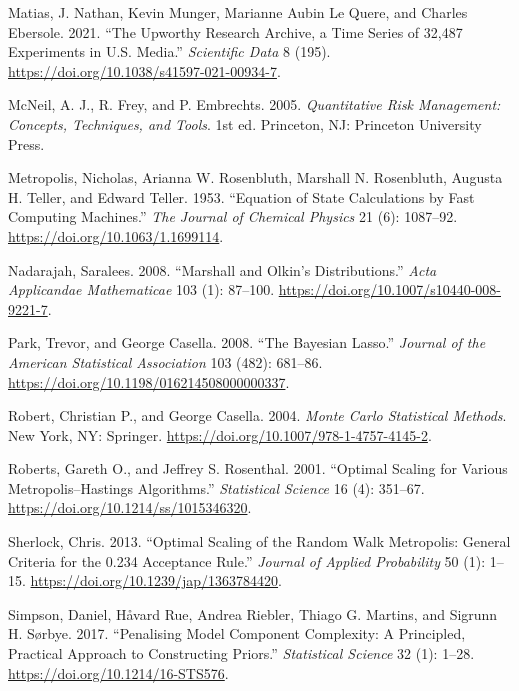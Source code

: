 \documentclass[
  11pt,
  letterpaper,
]{scrbook}
\newlength{\cslhangindent}
\newenvironment{CSLReferences}[2] %
 {\begin{list}{}{%
  \setlength{\itemindent}{0pt}
  \setlength{\leftmargin}{0pt}
  \setlength{\parsep}{0pt}
  \ifodd #1
   \setlength{\leftmargin}{\cslhangindent}
   \setlength{\itemindent}{-1\cslhangindent}
  \fi
  \setlength{\itemsep}{#2\baselineskip}}}
 {\end{list}}
\theoremstyle{definition}
\theoremstyle{plain}
\theoremstyle{plain}
\theoremstyle{definition}
\theoremstyle{definition}
\theoremstyle{remark}
\begin{document}
\begin{CSLReferences}{1}{0}
Matias, J. Nathan, Kevin Munger, Marianne Aubin Le Quere, and Charles
Ebersole. 2021. {``The {U}pworthy {R}esearch {A}rchive, a Time Series of
32,487 Experiments in {U.S.} Media.''} \emph{Scientific Data} 8 (195).
\url{https://doi.org/10.1038/s41597-021-00934-7}.

McNeil, A. J., R. Frey, and P. Embrechts. 2005. \emph{Quantitative Risk
Management: Concepts, Techniques, and Tools}. 1st ed. Princeton, NJ:
Princeton University Press.

Metropolis, Nicholas, Arianna W. Rosenbluth, Marshall N. Rosenbluth,
Augusta H. Teller, and Edward Teller. 1953. {``{Equation of State
Calculations by Fast Computing Machines}.''} \emph{The Journal of
Chemical Physics} 21 (6): 1087--92.
\url{https://doi.org/10.1063/1.1699114}.

Nadarajah, Saralees. 2008. {``{M}arshall and {O}lkin's Distributions.''}
\emph{Acta Applicandae Mathematicae} 103 (1): 87--100.
\url{https://doi.org/10.1007/s10440-008-9221-7}.

Park, Trevor, and George Casella. 2008. {``The {B}ayesian {L}asso.''}
\emph{Journal of the American Statistical Association} 103 (482):
681--86. \url{https://doi.org/10.1198/016214508000000337}.

Robert, Christian P., and George Casella. 2004. \emph{Monte {C}arlo
Statistical Methods}. New York, NY: Springer.
\url{https://doi.org/10.1007/978-1-4757-4145-2}.

Roberts, Gareth O., and Jeffrey S. Rosenthal. 2001. {``Optimal Scaling
for Various {M}etropolis--{H}astings Algorithms.''} \emph{Statistical
Science} 16 (4): 351--67. \url{https://doi.org/10.1214/ss/1015346320}.

Sherlock, Chris. 2013. {``Optimal Scaling of the Random Walk
{M}etropolis: General Criteria for the 0.234 Acceptance Rule.''}
\emph{Journal of Applied Probability} 50 (1): 1--15.
\url{https://doi.org/10.1239/jap/1363784420}.

Simpson, Daniel, Håvard Rue, Andrea Riebler, Thiago G. Martins, and
Sigrunn H. Sørbye. 2017. {``Penalising Model Component Complexity: A
Principled, Practical Approach to Constructing Priors.''}
\emph{Statistical Science} 32 (1): 1--28.
\url{https://doi.org/10.1214/16-STS576}.


\end{CSLReferences}
\end{document}

